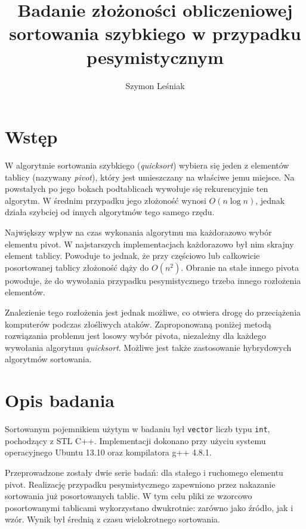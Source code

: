 \documentclass[a4paper,10pt]{article}
\title{Badanie złożoności obliczeniowej sortowania szybkiego
w przypadku pesymistycznym}
\author{Szymon Leśniak}
\begin{document}
\maketitle

\section{Wstęp}

\par W algorytmie sortowania szybkiego (\textit{quicksort}) wybiera się jeden
z elementów tablicy (nazywany \textit{pivot}), który jest umieszczany 
na właściwe jemu miejsce. Na powstałych po jego bokach podtablicach wywołuje
się rekurencyjnie ten algorytm. W średnim przypadku jego złożoność wynosi 
\(O(n \log n)\), jednak działa szybciej od innych algorytmów tego samego rzędu.

\par Największy wpływ na czas wykonania algorytmu ma każdorazowo wybór elementu
pivot. W  najstarszych implementacjach każdorazowo był nim skrajny element tablicy.
Powoduje to jednak, że przy częściowo lub całkowicie posortowanej tablicy
złożoność dąży do \(O(n^2)\). Obranie na stałe innego pivota powoduje, że do
wywołania przypadku pesymistycznego trzeba innego rozłożenia elementów. 

\par Znalezienie tego rozłożenia jest jednak możliwe, co otwiera drogę do
przeciążenia komputerów podczas złośliwych ataków. Zaproponowaną poniżej metodą
rozwiązania problemu jest losowy wybór pivota, niezależny dla każdego wywołania
algorytmu \textit{quicksort}. Możliwe jest także zastosowanie hybrydowych algorytmów
sortowania.

\section{Opis badania}

\par Sortowanym pojemnikiem użytym w badaniu był \verb+vector+ liczb typu
\verb+int+, pochodzący z STL C++. Implementacji 
dokonano przy użyciu systemu operacyjnego Ubuntu 13.10 oraz 
kompilatora g++ 4.8.1.

\par Przeprowadzone zostały dwie serie badań: dla stałego i ruchomego
elementu pivot. Realizację przypadku pesymistycznego zapewniono przez
nakazanie sortowania już posortowanych tablic. W tym celu pliki
ze wzorcowo posortowanymi tablicami wykorzystano dwukrotnie: zarówno
jako źródło, jak i wzór. Wynik był średnią z czasu wielokrotnego
sortowania.
\end{document}
